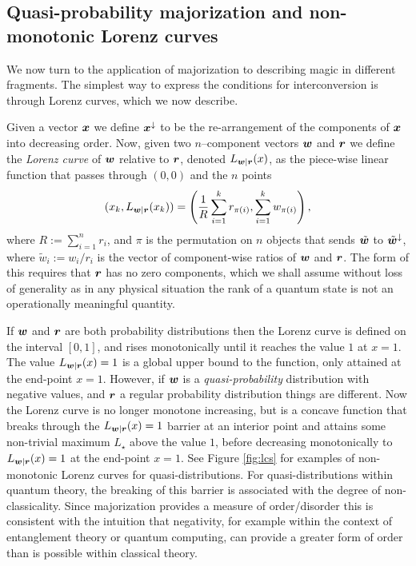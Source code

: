 \documentclass[pra,
aps,
twocolumn,
superscriptaddress,
groupedaddress,
nofootinbib,
reprint
]{revtex4-1}
\begin{document}
\subsection{Quasi-probability majorization and non-monotonic Lorenz curves}

We now turn to the application of majorization to describing magic in different fragments. The simplest way to express the conditions for interconversion is through Lorenz curves, which we now describe.

Given a vector $\boldsymbol{x}$ we define $\boldsymbol{x}^\downarrow$ to be the re-arrangement of the components of $\boldsymbol{x}$ into decreasing order. Now, given two $n$--component vectors $\boldsymbol{w}$ and $\boldsymbol{r}$ we define the \emph{Lorenz curve} of $\boldsymbol{w}$ relative to $\boldsymbol{r}$, denoted $L_{\boldsymbol{w}|\boldsymbol{r}}(x)$, as the piece-wise linear function that passes through $(0,0)$ and the $n$ points
\begin{equation}\label{eq:lorenz}
        (x_k,L_{\boldsymbol{w}|\boldsymbol{r}}(x_k)) =\left( \frac{1}{R}\sum_{i=1}^k r_{\pi(i)}, \sum_{i=1}^k w_{\pi(i)} \right),
\end{equation}
where $R:= \sum_{i=1}^n r_i$, and $\pi$ is the permutation on $n$ objects that sends $\tilde{\boldsymbol{w}}$ to $\tilde{\boldsymbol{w}}^{\downarrow}$, where $\tilde{w}_i := w_i/r_i$ is the vector of component-wise ratios of $\boldsymbol{w}$ and $\boldsymbol{r}$. The form of this requires that $\boldsymbol{r}$ has no zero components, which we shall assume without loss of generality as in any physical situation the rank of a quantum state is not an operationally meaningful quantity.

If $\boldsymbol{w}$ and $\boldsymbol{r}$ are both probability distributions then the Lorenz curve is defined on the interval $[0,1]$, and rises monotonically until it reaches the value $1$ at $x=1$. The value $L_{\boldsymbol{w}|\boldsymbol{r}}(x) = 1$ is a global upper bound to the function, only attained at the end-point $x=1$. However, if $\boldsymbol{w}$ is a \emph{quasi-probability} distribution with negative values, and $\boldsymbol{r}$ a regular probability distribution things are different. Now the Lorenz curve is no longer monotone increasing, but is a concave function that breaks through the $L_{\boldsymbol{w}|\boldsymbol{r}}(x) = 1$ barrier at an interior point and attains some non-trivial maximum $L_\star$ above the value $1$, before decreasing monotonically to $L_{\boldsymbol{w}|\boldsymbol{r}}(x)= 1$ at the end-point $x=1$. See Figure \ref{fig:lcs} for examples of non-monotonic Lorenz curves for quasi-distributions. For quasi-distributions within quantum theory, the breaking of this barrier is associated with the degree of non-classicality. Since majorization provides a measure of order/disorder this is consistent with the intuition that negativity, for example within the context of entanglement theory or quantum computing, can provide a greater form of order than is possible within classical theory.
\end{document}
